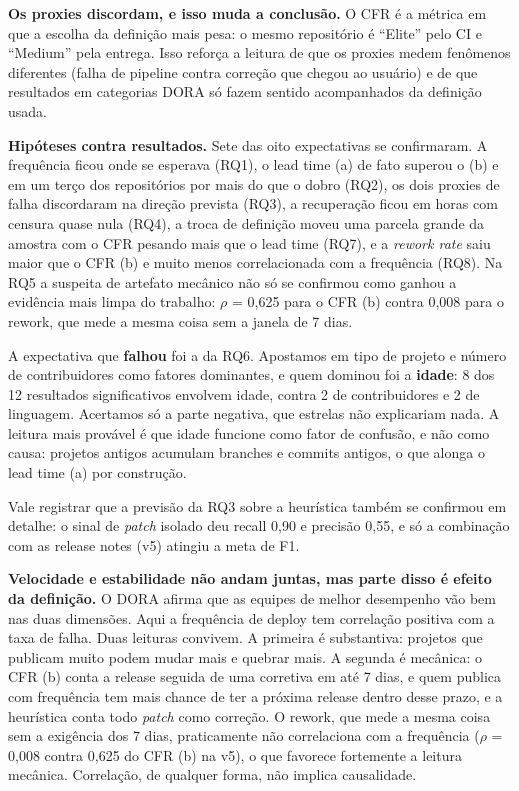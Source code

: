 \documentclass[12pt]{article}
\begin{document}
\textbf{Os proxies discordam, e isso muda a conclusão.} O CFR é a métrica em
que a escolha da definição mais pesa: o mesmo repositório é ``Elite'' pelo CI e
``Medium'' pela entrega. Isso reforça a leitura de que os proxies medem
fenômenos diferentes (falha de pipeline contra correção que chegou ao usuário)
e de que resultados em categorias DORA só fazem sentido acompanhados da
definição usada.

\textbf{Hipóteses contra resultados.} Sete das oito expectativas se
confirmaram. A frequência ficou onde se esperava (RQ1), o lead time (a) de fato
superou o (b) e em um terço dos repositórios por mais do que o dobro (RQ2), os
dois proxies de falha discordaram na direção prevista (RQ3), a recuperação
ficou em horas com censura quase nula (RQ4), a troca de definição moveu uma
parcela grande da amostra com o CFR pesando mais que o lead time (RQ7), e a
\emph{rework rate} saiu maior que o CFR (b) e muito menos correlacionada com a
frequência (RQ8). Na RQ5 a suspeita de artefato mecânico não só se confirmou
como ganhou a evidência mais limpa do trabalho: $\rho$ = 0,625 para o CFR (b)
contra 0,008 para o rework, que mede a mesma coisa sem a janela de 7 dias.

A expectativa que \textbf{falhou} foi a da RQ6. Apostamos em tipo de projeto e
número de contribuidores como fatores dominantes, e quem dominou foi a
\textbf{idade}: 8 dos 12 resultados significativos envolvem idade, contra 2 de
contribuidores e 2 de linguagem. Acertamos só a parte negativa, que estrelas
não explicariam nada. A leitura mais provável é que idade funcione como fator
de confusão, e não como causa: projetos antigos acumulam branches e commits
antigos, o que alonga o lead time (a) por construção.

Vale registrar que a previsão da RQ3 sobre a heurística também se confirmou em
detalhe: o sinal de \emph{patch} isolado deu recall 0,90 e precisão 0,55, e só
a combinação com as release notes (v5) atingiu a meta de F1.

\textbf{Velocidade e estabilidade não andam juntas, mas parte disso é efeito da
definição.} O DORA afirma que as equipes de melhor desempenho vão bem nas duas
dimensões. Aqui a frequência de deploy tem correlação positiva com a taxa de
falha. Duas leituras convivem. A primeira é substantiva: projetos que publicam
muito podem mudar mais e quebrar mais. A segunda é mecânica: o CFR (b) conta a
release seguida de uma corretiva em até 7 dias, e quem publica com frequência
tem mais chance de ter a próxima release dentro desse prazo, e a heurística
conta todo \emph{patch} como correção. O rework, que mede a mesma coisa sem a
exigência dos 7 dias, praticamente não correlaciona com a frequência ($\rho$ =
0,008 contra 0,625 do CFR (b) na v5), o que favorece fortemente a leitura
mecânica. Correlação, de qualquer forma, não implica causalidade.
\end{document}
